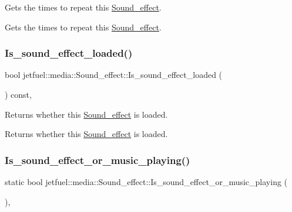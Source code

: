 Gets the times to repeat this \hyperlink{classjetfuel_1_1media_1_1Sound__effect}{Sound\+\_\+effect}. 

Gets the times to repeat this \hyperlink{classjetfuel_1_1media_1_1Sound__effect}{Sound\+\_\+effect}. \mbox{\label{classjetfuel_1_1media_1_1Sound__effect_a6f646b304bc3617e027a4d503e4124db}} 
\subsubsection{\texorpdfstring{Is\+\_\+sound\+\_\+effect\+\_\+loaded()}{Is\_sound\_effect\_loaded()}}
{\footnotesize\ttfamily bool jetfuel\+::media\+::\+Sound\+\_\+effect\+::\+Is\+\_\+sound\+\_\+effect\+\_\+loaded (\begin{DoxyParamCaption}{ }\end{DoxyParamCaption}) const\hspace{0.3cm}{\ttfamily [inline]}, {\ttfamily [protected]}}



Returns whether this \hyperlink{classjetfuel_1_1media_1_1Sound__effect}{Sound\+\_\+effect} is loaded. 

Returns whether this \hyperlink{classjetfuel_1_1media_1_1Sound__effect}{Sound\+\_\+effect} is loaded. \mbox{\label{classjetfuel_1_1media_1_1Sound__effect_ae81630f796281931d9c2f1dc3a0e9319}} 
\subsubsection{\texorpdfstring{Is\+\_\+sound\+\_\+effect\+\_\+or\+\_\+music\+\_\+playing()}{Is\_sound\_effect\_or\_music\_playing()}}
{\footnotesize\ttfamily static bool jetfuel\+::media\+::\+Sound\+\_\+effect\+::\+Is\+\_\+sound\+\_\+effect\+\_\+or\+\_\+music\+\_\+playing (\begin{DoxyParamCaption}{ }\end{DoxyParamCaption})\hspace{0.3cm}{\ttfamily [inline]}, {\ttfamily [static]}}




